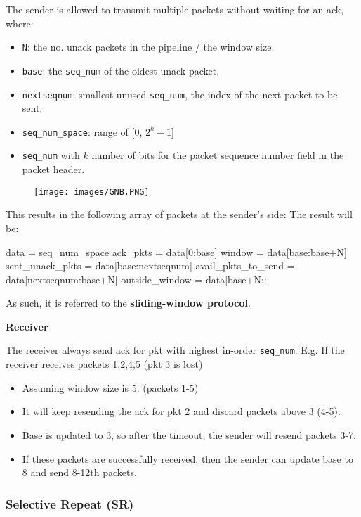 \documentclass[a4paper]{article}
\begin{document}
\medskip
\noindent The sender is allowed to transmit multiple packets without waiting for an ack, where:
\begin{itemize}
    \item \texttt{N}: the no. unack packets in the pipeline / the window size.
    \item \texttt{base}: the \texttt{seq\_num} of the oldest unack packet.
    \item \texttt{nextseqnum}: smallest unused \texttt{seq\_num}, the index of the next packet to be sent.
    \item \texttt{seq\_num\_space}: range of [$0$, $2^k-1$]
    \item \texttt{seq\_num} with $k$ number of bits for the packet sequence number field in the packet header.
\end{itemize}

\begin{figure}[H]
    \centering
    \texttt{[image: images/GNB.PNG]}
\end{figure}
\newpage
This results in the following array of packets at the sender's side:
\noindent The result will be:
\begin{python}
    data = seq_num_space
    ack_pkts = data[0:base]
    window = data[base:base+N]
    sent_unack_pkts = data[base:nextseqnum]
    avail_pkts_to_send = data[nextseqnum:base+N]
    outside_window = data[base+N::]
\end{python}
As such, it is referred to the \textbf{sliding-window protocol}.
\bigskip

\noindent \textbf{Receiver}
\medskip

\noindent The receiver always send ack for pkt with highest in-order \texttt{seq\_num}. E.g. If the receiver receives packets 1,2,4,5 (pkt 3 is lost)
\begin{itemize}
    \item Assuming window size is 5. (packets 1-5)
    \item It will keep resending the ack for pkt 2 and discard packets above 3 (4-5).
    \item Base is updated to 3, so after the timeout, the sender will resend packets 3-7.
    \item If these packets are successfully received, then the sender can update base to 8 and send 8-12th packets.\end{itemize}

\subsubsection{Selective Repeat (SR)}
\end{document}
